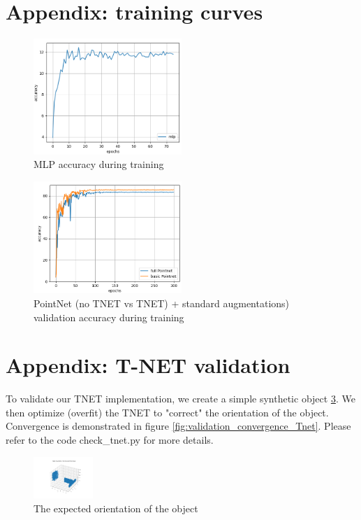 \documentclass[a4paper]{article}
\begin{document}
\section*{Appendix: training curves}

    
\begin{figure}[H]
    \centering
    \includegraphics[width=0.5\textwidth]{figures/Q1.png}
    \caption{MLP accuracy during training}
    \label{fig:MLP}
\end{figure}

\begin{figure}[H]
    \centering
    \includegraphics[width=0.5\textwidth]{figures/Q3.png}
    \caption{PointNet (no TNET vs TNET) + standard augmentations) validation accuracy during training}
    \label{fig:pointNet}
\end{figure}

\break


\section*{Appendix: T-NET validation}
To validate our TNET implementation, we create a simple synthetic object \ref{fig:validation_object}.
We then optimize (overfit) the TNET to "correct" the orientation of the object. Convergence is demonstrated in figure \ref{fig:validation_convergence_Tnet}. Please refer to the code check\_tnet.py for more details.

\begin{figure}[H]
    \centering
    \includegraphics[width=0.2\textwidth]{figures/TNET_validation.png}
    \caption{The expected orientation of the object}
    \label{fig:validation_object}
\end{figure}
\end{document}
